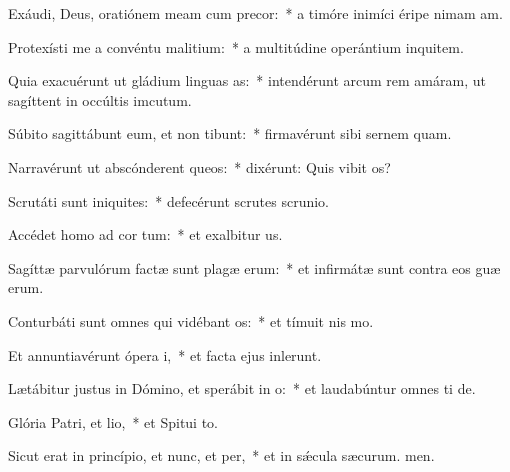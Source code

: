 \item Exáudi, Deus, oratiónem meam cum precor:~* a timóre inimíci éripe nimam am.
\item Protexísti me a convéntu malitium:~* a multitúdine operántium inquitem.
\item Quia exacuérunt ut gládium linguas as:~* intendérunt arcum rem amáram, ut sagíttent in occúltis imcutum.
\item Súbito sagittábunt eum, et non tibunt:~* firmavérunt sibi sernem quam.
\item Narravérunt ut abscónderent queos:~* dixérunt: Quis vibit os?
\item Scrutáti sunt iniquites:~* defecérunt scrutes scrunio.
\item Accédet homo ad cor tum:~* et exalbitur us.
\item Sagíttæ parvulórum factæ sunt plagæ erum:~* et infirmátæ sunt contra eos guæ erum.
\item Conturbáti sunt omnes qui vidébant os:~* et tímuit nis mo.
\item Et annuntiavérunt ópera i,~* et facta ejus inlerunt.
\item Lætábitur justus in Dómino, et sperábit in o:~* et laudabúntur omnes ti de.
\item Glória Patri, et lio,~* et Spitui to.
\item Sicut erat in princípio, et nunc, et per,~* et in sǽcula sæcurum. men.
